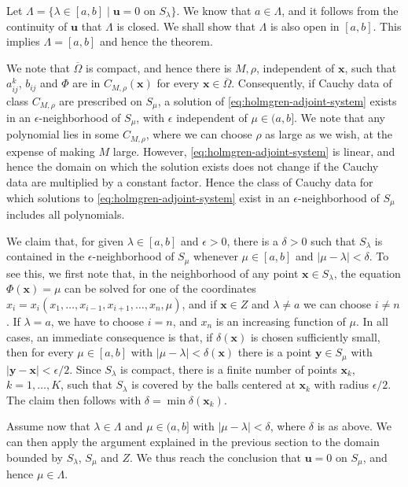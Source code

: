 \begin{Proof}Let $\Lambda=\{\lambda\in[a,b]\mid\bm{u}=0\text{ on }S_\lambda\}$. We know that $a\in\Lambda$, and it follows from the continuity of $\bm{u}$ that $\Lambda$ is closed. We shall show that $\Lambda$ is also open in $[a,b]$. This implies $\Lambda=[a,b]$ and hence the theorem.

We note that $\overline\Omega$ is compact, and hence there is $M,\rho$, independent of $\bm{x}$, such that $a_{ij}^k$, $b_{ij}$ and $\Phi$ are in $C_{M,\rho}(\bm{x})$ for every $\bm{x}\in\overline\Omega$. Consequently, if Cauchy data of class $C_{M,\rho}$ are prescribed on $S_\mu$, a solution of \eqref{eq:holmgren-adjoint-system} exists in an $\epsilon$-neighborhood of $S_\mu$, with $\epsilon$ independent of $\mu\in(a,b]$. We note that any polynomial lies in some $C_{M,\rho}$, where we can choose $\rho$ as large as we wish, at the expense of making $M$ large. However, \eqref{eq:holmgren-adjoint-system} is linear, and hence the domain on which the solution exists does not change if the Cauchy data are multiplied by a constant factor. Hence the class of Cauchy data for which solutions to \eqref{eq:holmgren-adjoint-system} exist in an $\epsilon$-neighborhood of $S_\mu$ includes all polynomials.

We claim that, for given $\lambda\in[a,b]$ and $\epsilon>0$, there is a $\delta>0$ such that $S_\lambda$ is contained in the $\epsilon$-neighborhood of $S_\mu$ whenever $\mu\in[a,b]$ and $|\mu-\lambda|<\delta$. To see this, we first note that, in the neighborhood of any point $\bm{x}\in S_\lambda$, the equation $\Phi(\bm{x})=\mu$ can be solved for one of the coordinates $x_i=x_i(x_1,\ldots,x_{i-1},x_{i+1},\ldots,x_n,\mu)$, and if $\bm{x}\in Z$ and $\lambda\ne a$ we can choose $i\ne n$. If $\lambda=a$, we have to choose $i=n$, and $x_n$ is an increasing function of $\mu$. In all cases, an immediate consequence is that, if $\delta(\bm{x})$ is chosen sufficiently small, then for every $\mu\in[a,b]$ with $|\mu-\lambda|<\delta(\bm{x})$ there is a point $\bm{y}\in S_\mu$ with $|\bm{y}-\bm{x}|<\epsilon/2$. Since $S_\lambda$ is compact, there is a finite number of points $\bm{x}_k$, $k=1,\ldots,K$, such that $S_\lambda$ is covered by the balls centered at $\bm{x}_k$ with radius $\epsilon/2$. The claim then follows with $\delta=\min\delta(\bm{x}_k)$.

Assume now that $\lambda\in\Lambda$ and $\mu\in(a,b]$ with $|\mu-\lambda|<\delta$, where $\delta$ is as above. We can then apply the argument explained in the previous section to the domain bounded by $S_\lambda$, $S_\mu$ and $Z$. We thus reach the conclusion that $\bm{u}=0$ on $S_\mu$, and hence $\mu\in\Lambda$.\end{Proof}

